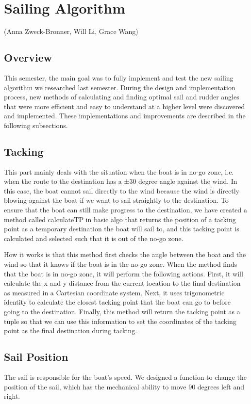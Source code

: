 \documentclass{article}
\begin{document}
\section{Sailing Algorithm}

(Anna Zweck-Bronner, Will Li, Grace Wang)
\subsection{Overview}
This semester, the main goal was to fully implement and test the new sailing algorithm we researched last semester. During the design and implementation process, new methods of calculating and finding optimal sail and rudder angles that were more efficient and easy to understand at a higher level were discovered and implemented. These implementations and improvements are described in the following subsections. 

\subsection{Tacking}
This part mainly deals with the situation when the boat is in no-go zone, i.e. when the route to the destination has a ±30 degree angle against the wind. In this case, the boat cannot sail directly to the wind because the wind is directly blowing against the boat if we want to sail straightly to the destination. To ensure that the boat can still make progress to the destination, we have created a method called calculateTP in basic algo that returns the position of a tacking point as a temporary destination the boat will sail to, and this tacking point is calculated and selected such that it is out of the no-go zone. 

How it works is that this method first checks the angle between the boat and the wind so that it knows if the boat is in the no-go zone. When the method finds that the boat is in no-go zone, it will perform the following actions. First, it will calculate the x and y distance from the current location to the final destination as measured in a Cartesian coordinate system. Next, it uses trigonometric identity to calculate the closest tacking point that the boat can go to before going to the destination. Finally, this method will return the tacking point as a tuple so that we can use this information to set the coordinates of the tacking point as the final destination during tacking.


\subsection{Sail Position}
The sail is responsible for the boat's speed. We designed a function to change the position of the sail, which has the mechanical ability to move 90 degrees left and right.
\end{document}
